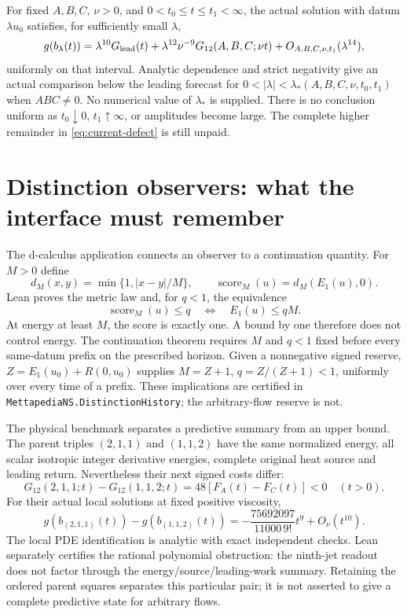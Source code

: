 \documentclass[11pt]{article}
\theoremstyle{definition}
\begin{document}
For fixed $A,B,C$, $\nu>0$, and $0<t_0\le t\le t_1<\infty$, the actual
solution with datum $\lambda u_0$ satisfies, for sufficiently small $\lambda$,
\[
 g(b_\lambda(t))=\lambda^{10}G_{\rm lead}(t)
   +\lambda^{12}\nu^{-9}G_{12}(A,B,C;\nu t)
   +O_{A,B,C,\nu,t_1}(\lambda^{14}),
\]
uniformly on that interval. Analytic dependence and strict negativity give an
actual comparison below the leading forecast for
$0<|\lambda|<\lambda_*(A,B,C,\nu,t_0,t_1)$ when $ABC\ne0$.
No numerical value of $\lambda_*$ is supplied. There is no conclusion uniform
as $t_0\downarrow0$, $t_1\uparrow\infty$, or amplitudes become large.
The complete higher remainder in \eqref{eq:current-defect} is still unpaid.

\section{Distinction observers: what the interface must remember}
\label{sec:current-observers}

The d-calculus application connects an observer to a continuation quantity.
For $M>0$ define
\[
 d_M(x,y)=\min\{1,|x-y|/M\},\qquad
 \operatorname{score}_M(u)=d_M(E_1(u),0).
\]
Lean proves the metric law and, for $q<1$, the equivalence
\[
 \operatorname{score}_M(u)\le q
 \quad\Longleftrightarrow\quad E_1(u)\le qM.
\]
At energy at least $M$, the score is exactly one. A bound by one therefore
does not control energy. The continuation theorem requires $M$ and $q<1$
fixed before every same-datum prefix on the prescribed horizon. Given a
nonnegative signed reserve, $Z=E_1(u_0)+R(0,u_0)$ supplies
$M=Z+1$, $q=Z/(Z+1)<1$, uniformly over every time of a prefix. These
implications are certified in \texttt{MettapediaNS.DistinctionHistory}; the
arbitrary-flow reserve is not.

The physical benchmark separates a predictive summary from an upper bound.
The parent triples $(2,1,1)$ and $(1,1,2)$ have the same normalized energy,
all scalar isotropic integer derivative energies, complete original heat
source and leading return. Nevertheless their next signed costs differ:
\[
 G_{12}(2,1,1;t)-G_{12}(1,1,2;t)
 =48[F_A(t)-F_C(t)]<0\quad(t>0).
\]
For their actual local solutions at fixed positive viscosity,
\[
 g(b_{(2,1,1)}(t))-g(b_{(1,1,2)}(t))
 =-\frac{75692097}{11000\,9!}t^9+O_\nu(t^{10}).
\]
The local PDE identification is analytic with exact independent checks.
Lean separately certifies the rational polynomial obstruction: the ninth-jet
readout does not factor through the energy/source/leading-work summary.
Retaining the ordered parent squares separates this particular pair; it is
not asserted to give a complete predictive state for arbitrary flows.
\end{document}
